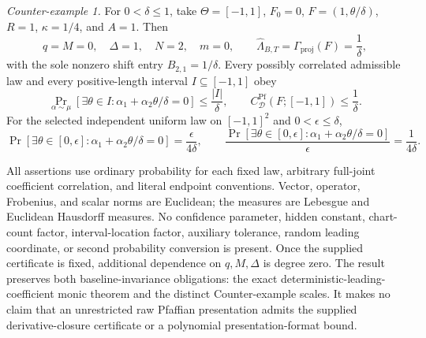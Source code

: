 \begin{theorem}
\emph{Counter-example 1.} For $0<\delta\leq1$, take $\Theta=[-1,1]$, $F_0=0$,
$F=(1,\theta/\delta)$, $R=1$, $\kappa=1/4$, and $A=1$. Then
\begin{equation}
\label{eq:main-display-015}
q=M=0,\quad \Delta=1,\quad N=2,\quad m=0,
\qquad \widehat\Lambda_{B,T}=\Gamma_{\mathrm{proj}}(F)=\frac1\delta,
\end{equation}
with the sole nonzero shift entry $B_{2,1}=1/\delta$. Every possibly correlated admissible law and every
positive-length interval $I\subseteq[-1,1]$ obey
\begin{equation}
\label{eq:main-display-016}
\Pr_{\alpha\sim\mu}[\exists\theta\in I:\alpha_1+\alpha_2\theta/\delta=0]\leq\frac{|I|}{\delta},
\qquad C^{\mathrm{Pf}}_{\mathcal D}(F;[-1,1])\leq\frac1\delta.
\end{equation}
For the selected independent uniform law on $[-1,1]^2$ and $0<\epsilon\leq\delta$,
\begin{equation}
\label{eq:main-display-017}
\Pr[\exists\theta\in[0,\epsilon]:\alpha_1+\alpha_2\theta/\delta=0]
=\frac{\epsilon}{4\delta},\qquad
\frac{\Pr[\exists\theta\in[0,\epsilon]:\alpha_1+\alpha_2\theta/\delta=0]}{\epsilon}
=\frac1{4\delta}.
\end{equation}

All assertions use ordinary probability for each fixed law, arbitrary full-joint coefficient correlation,
and literal endpoint conventions. Vector, operator, Frobenius, and scalar norms are Euclidean; the measures
are Lebesgue and Euclidean Hausdorff measures. No confidence parameter, hidden constant, chart-count factor,
interval-location factor, auxiliary tolerance, random leading coordinate, or second probability conversion is
present. Once the supplied certificate is fixed, additional dependence on $q,M,\Delta$ is degree zero. The result preserves both
baseline-invariance obligations: the exact deterministic-leading-coefficient monic theorem and the distinct
Counter-example scales. It makes no claim that an unrestricted raw Pfaffian presentation admits the supplied
derivative-closure certificate or a polynomial presentation-format bound.
\end{theorem}
